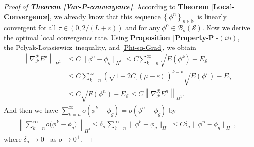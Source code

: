 \documentclass[preprint,3p]{elsarticle}
\begin{document}
\begin{proof}[Proof of {\bf Theorem \ref{Var-P-convergence}}] According to {\bf Theorem \ref{Local-Convergence}}, we already know that this sequence $\left\{\phi^n\right\}_{n\in\mathbb{N}}$ is linearly convergent for all $\tau\in(0,2/(L+\varepsilon))$ and for any $\phi^0\in\mathcal{B}_{\sigma}(\mathcal{S})$. Now we derive the optimal local convergence rate. Using {\bf Proposition \ref{Property-P}}-$(iii)$, the Polyak-\L ojasiewicz\ inequality, and \eqref{Phi-eq-Grad}, we obtain
	\begin{align}\label{Phi-eq-Energy}
		\nonumber\left\|\nabla_{\mathcal{P}}^{\mathcal{R}}E^n\right\|_{H^1}&\le C\|\phi^n-\phi_g\|_{H^1}\le C\sum\limits_{k=n}^{\infty}\sqrt{E(\phi^{k})-E_{\mathcal{S}}}\\
		&\nonumber\le C\sum\limits_{k=n}^{\infty}\left(\sqrt{1-2C_{\tau}(\mu-\varepsilon)}\right)^{k-n}\sqrt{E(\phi^{n})-E_{\mathcal{S}}}\\
		&\le C\sqrt{E(\phi^{n})-E_{\mathcal{S}}}\le C	\left\|\nabla_{\mathcal{P}}^{\mathcal{R}}E^n\right\|_{H^1}.
	\end{align}	
	And then we have  $\sum\limits_{k=n}^{\infty}o\left(\phi^k-\phi_g\right)=o\left(\phi^n-\phi_g\right)$ by 
	\begin{align*}
		\left\|\sum_{k=n}^{\infty}o\big(\phi^k-\phi_g\big)\right\|_{H^1}\le\delta_{\sigma}\sum_{k=n}^{\infty}\|\phi^k-\phi_g\|_{H^1}\le C\delta_{\sigma}\|\phi^n-\phi_g\|_{H^1},
	\end{align*}
	where $\delta_{\sigma}\to0^+$ as $\sigma\to0^+$. 
	

\end{proof}
\end{document}
